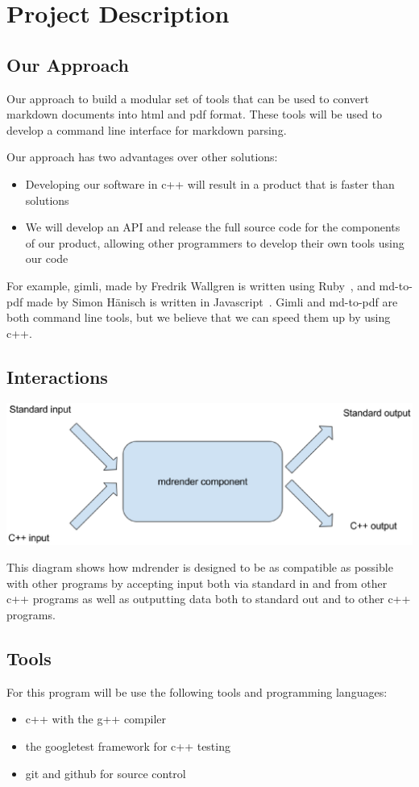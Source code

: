 \section{Project Description}

\subsection{Our Approach}
Our approach to build a modular set of tools that can be used to convert markdown documents into html and pdf format. These tools will be used to develop a command line interface for markdown parsing.

Our approach has two advantages over other solutions:
\begin{itemize}
	\item Developing our software in c++ will result in a product that is faster than solutions
	\item We will develop an API and release the full source code for the components of our product, allowing other programmers to develop their own tools using our code
\end{itemize}
For example, gimli, made by Fredrik Wallgren is written using Ruby~\cite{gimli}, and md-to-pdf made by Simon Hänisch is written in Javascript~\cite{md-to-pdf}. Gimli and md-to-pdf are both command line tools, but we believe that we can speed them up by using c++.

\subsection{Interactions}

\includegraphics[width=500pt]{images/mdrender_interactions.eps}

This diagram shows how mdrender is designed to be as compatible as possible with other programs by accepting input both via standard in and from other c++ programs as well as outputting data both to standard out and to other c++ programs.

\subsection{Tools}
For this program will be use the following tools and programming languages:
\begin{itemize}
	\item c++ with the g++ compiler
	\item the googletest framework for c++ testing
	\item git and github for source control
\end{itemize}


